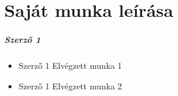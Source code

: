 \chapter*{Saját munka leírása}

\ifdefined\printName
    \paragraph{{Szerző 1}}
\fi

\begin{itemize}
    \item
    {{Szerző 1 Elvégzett munka 1}}
    \item
    {{Szerző 1 Elvégzett munka 2}}
\end{itemize}
